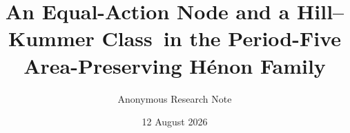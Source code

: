 \documentclass[11pt]{article}
\title{An Equal-Action Node and a Hill--Kummer Class\
in the Period-Five Area-Preserving H\'enon Family}
\author{Anonymous Research Note}
\date{12 August 2026}
\theoremstyle{definition}
\theoremstyle{remark}
\begin{document}
\maketitle

\begin{abstract}

\end{abstract}












\appendix

\end{document}
